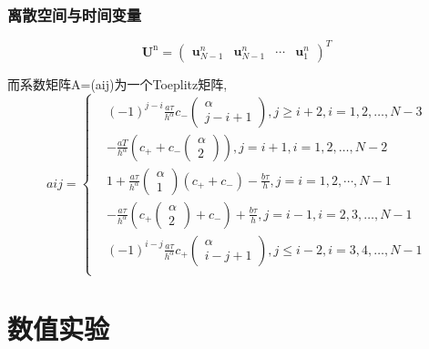 \documentclass[notheorems,serif]{beamer}
\begin{document}
\begin{frame}
\frametitle{离散空间与时间变量}
\begin{equation*}
\boldsymbol{U}^{\mathrm{n}}=\left( \begin{array}{llll}{\boldsymbol{u}_{N-1}^{n}} & {\boldsymbol{u}_{N-1}^{n}} & {\cdots} & {\boldsymbol{u}_{1}^{n}}\end{array}\right)^{T}
\end{equation*}

而系数矩阵A=(aij)为一个Toeplitz矩阵,	
\begin{equation*}
aij=\left\{
\begin{aligned}
& (-1)^{j-i} \frac{a \tau}{h^{\alpha}} c_{-} \left( \begin{array}{c}{\alpha} \\ {j-i+1}\end{array}\right),
j \geq i+2, i=1,2, \dots, N-3
\\
& -\frac{a T}{h^{\alpha}}\left(c_{+}+c_{-} \left( \begin{array}{l}{\alpha} \\ {2}\end{array}\right)\right),j=i+1, i=1,2, \dots, N-2 
\\
& 1+\frac{a \tau}{h^{\alpha}} \left( \begin{array}{l}{\alpha} \\ {1}\end{array}\right)\left(c_{+}+c_{-}\right)-\frac{b \tau}{h},j=i=1,2, \cdots, N-1 
\\
& -\frac{a \tau}{h^{\alpha}}\left(c_{+} \left( \begin{array}{l}{\alpha} \\ {2}\end{array}\right)+c_{-}\right)+\frac{b \tau}{h},j=i-1, i=2,3, \dots, N-1
\\
& (-1)^{i-j} \frac{a \tau}{h^{\alpha}} c_{+} \left( \begin{array}{c}{\alpha} \\ {i-j+1}\end{array}\right),j \leq i-2, i=3,4, \dots, N-1
\\
\end{aligned}
\right.	
\end{equation*}
\end{frame}


\section{数值实验}
\end{document}
